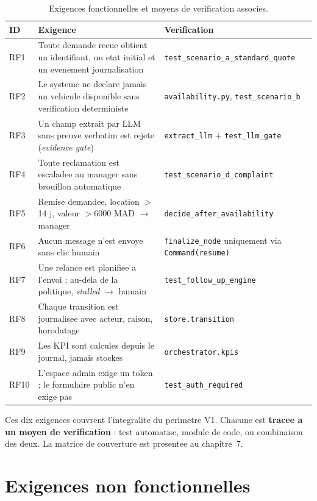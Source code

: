 \documentclass[12pt,a4paper,openany]{report}
\begin{document}
\begin{table}[H]\centering\small
\caption{Exigences fonctionnelles et moyens de verification associes.}
\label{tab:rf}
\begin{tabularx}{\textwidth}{l X l}\toprule
\rowcolor{boxBlue!30}\textbf{ID} & \textbf{Exigence} & \textbf{Verification}\\\midrule
RF1  & Toute demande recue obtient un identifiant, un etat initial et un evenement journalisation & \texttt{test\_scenario\_a\_standard\_quote}\\
RF2  & Le systeme ne declare jamais un vehicule disponible sans verification deterministe & \texttt{availability.py}, \texttt{test\_scenario\_b}\\
RF3  & Un champ extrait par LLM sans preuve verbatim est rejete (\emph{evidence gate}) & \texttt{extract\_llm} + \texttt{test\_llm\_gate}\\
RF4  & Toute reclamation est escaladee au manager sans brouillon automatique & \texttt{test\_scenario\_d\_complaint}\\
RF5  & Remise demandee, location $>$14 j, valeur $>$6000 MAD $\rightarrow$ manager & \texttt{decide\_after\_availability}\\
RF6  & Aucun message n'est envoye sans clic humain & \texttt{finalize\_node} uniquement via \texttt{Command(resume)}\\
RF7  & Une relance est planifiee a l'envoi ; au-dela de la politique, \emph{stalled} $\rightarrow$ humain & \texttt{test\_follow\_up\_engine}\\
RF8  & Chaque transition est journalisee avec acteur, raison, horodatage & \texttt{store.transition}\\
RF9  & Les KPI sont calcules depuis le journal, jamais stockes & \texttt{orchestrator.kpis}\\
RF10 & L'espace admin exige un token ; le formulaire public n'en exige pas & \texttt{test\_auth\_required}\\
\bottomrule
\end{tabularx}
\end{table}

Ces dix exigences couvrent l'integralite du perimetre V1. Chacune est \textbf{tracee a un moyen de verification} : test automatise, module de code, ou combinaison des deux. La matrice de couverture est presentee au chapitre~7.

\section{Exigences non fonctionnelles}
\end{document}
